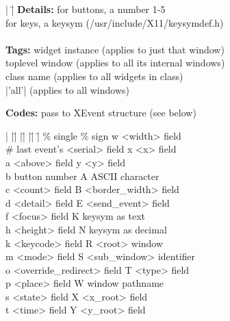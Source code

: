 \begin{tabbing}
|       |\= \kill
{\bf Details:} \> for buttons, a number 1-5 \\
	\> for keys, a keysym (/usr/include/X11/keysymdef.h) \\
\\
{\bf Tags:}    \>  widget instance (applies to just that window) \\
	\>  toplevel window (applies to all its internal windows) \\
	\>  class name (applies to all widgets in class) \\
	\>  |'all'| (applies to all windows)
\end{tabbing}

{\bf Codes:}  pass to XEvent structure (see below)
\begin{tabbing}
|  |\=|    |\=|                    |\=|    |\= \kill
   \> \% \> single \% sign    \> w \> <width> field  \\
   \> \# \> last event's <serial> field    \> x \> <x> field  \\
   \> a  \> <above> field     \> y \> <y> field  \\
   \> b  \> button number     \> A \> ASCII character  \\
   \> c  \> <count> field     \> B \> <border\_width> field  \\
   \> d  \> <detail> field    \> E \> <send\_event> field  \\ 
   \> f  \> <focus> field     \> K \> keysym as text  \\      
   \> h  \> <height> field    \> N \> keysym as decimal  \\   
   \> k  \> <keycode> field   \> R \> <root> window  \\       
   \> m  \> <mode> field      \> S \> <sub\_window> identifier  \\
   \> o  \> <override\_redirect> field \> T \> <type> field  \\
   \> p  \> <place> field     \>  W \> window pathname  \\
   \> s  \> <state> field     \> X \> <x\_root> field  \\ 
   \> t  \> <time> field      \> Y \> <y\_root> field  \\ 
\end{tabbing}
\vspace{-8pt}

